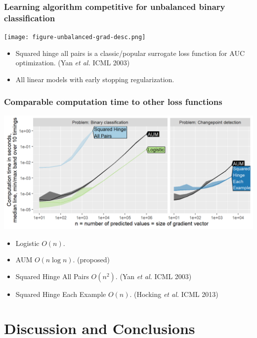\documentclass[t]{beamer}
\begin{document}
\begin{frame}
  \frametitle{Learning algorithm competitive for unbalanced binary classification}

 \texttt{[image: figure-unbalanced-grad-desc.png]}

 \begin{itemize}
 \item Squared hinge all pairs is a classic/popular surrogate loss function
   for AUC optimization. (Yan \emph{et al.} ICML 2003)
 \item All linear models with early stopping regularization.
 \end{itemize}

\end{frame}

\begin{frame}
  \frametitle{Comparable computation time to other loss functions}

\includegraphics[width=\textwidth]{figure-aum-grad-speed-both.png}

\begin{itemize}
\item Logistic $O(n)$. 
\item AUM $O(n\log n)$. (proposed)
\item Squared Hinge All Pairs $O(n^2)$. (Yan \emph{et al.} ICML 2003)
\item Squared Hinge Each Example $O(n)$. (Hocking \emph{et al.} ICML 2013)
\end{itemize}
  
\end{frame}

\section{Discussion and Conclusions}
\end{document}
